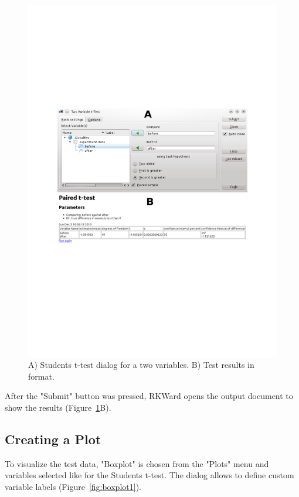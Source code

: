 \begin{figure}[htp]
 \centering
 \includegraphics[clip=true,trim=0cm 5.7cm 0cm 5.7cm,width=16cm]{../figures/t-test.pdf}
 \caption{A) Students t-test dialog for a two variables. B) Test results in  format.}
 \label{fig:t_test}
\end{figure}

After the "Submit" button was pressed, RKWard opens the output document
to show the results (Figure~\ref{fig:t_test}B).

\subsection{Creating a Plot}
\label{sec:create_plot}
To visualize the test data, "Boxplot" is chosen from the "Plots" menu
and variables selected like for the Students t-test.
The dialog allows to define custom variable labels (Figure~\ref{fig:boxplot1}).

